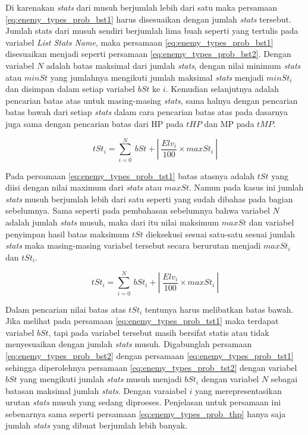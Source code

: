 Di karenakan \textit{stats} dari musuh berjumlah lebih dari satu maka persamaan \ref{eq:enemy_types_prob_bst1} harus disesuaikan dengan jumlah \textit{stats} tersebut. Jumlah stats dari musuh sendiri berjumlah lima buah seperti yang tertulis pada variabel \textit{List Stats Name}, maka persamaan \ref{eq:enemy_types_prob_bst1} disesuaikan menjadi seperti persamaan \ref{eq:enemy_types_prob_bst2}. Dengan variabel $N$ adalah batas maksimal dari jumlah \textit{stats}, dengan nilai minimum \textit{stats} atau $minSt$ yang jumlahnya mengikuti jumlah maksimal \textit{stats} menjadi $minSt_{i}$ dan disimpan dalam setiap variabel $bSt$ ke $i$. Kemudian selanjutnya adalah pencarian batas atas untuk masing-masing \textit{stats}, sama halnya dengan pencarian batas bawah dari setiap \textit{stats} dalam cara pencarian batas atas pada dasarnya juga sama dengan pencarian batas dari HP pada $tHP$ dan MP pada $tMP$.
\vspace{1ex}

\begin{equation}\label{eq:enemy_types_prob_tst1}
tSt_{i} = \sum_{i=0}^{N}\ bSt + \left |\ \frac{Elv_{i}}{100} \times maxSt_{i}\ \right |
\end{equation}

Pada persamaan \ref{eq:enemy_types_prob_tst1} batas atasnya adalah $tSt$ yang diisi dengan nilai maximum dari \textit{stats} atau $maxSt$. Namun pada kasus ini jumlah \textit{stats} musuh berjumlah lebih dari satu seperti yang sudah dibahas pada bagian sebelumnya. Sama seperti pada pembahasan sebelumnya bahwa variabel $N$ adalah jumlah \textit{stats} musuh, maka dari itu nilai maksimum $maxSt$ dan variabel penyimpan hasil batas maksimum $tSt$ dieksekusi sesuai satu-satu sesuai jumlah \textit{stats} maka masing-masing variabel tersebut secara berurutan menjadi $maxSt_{i}$ dan $tSt_{i}$.
\vspace{1ex}

\begin{equation}\label{eq:enemy_types_prob_tst2}
tSt_{i} = \sum_{i=0}^{N}\ bSt_{i} + \left |\ \frac{Elv_{i}}{100} \times maxSt_{i}\ \right |
\end{equation}

Dalam pencarian nilai batas atas $tSt_{i}$ tentunya harus melibatkan batas bawah. Jika melihat pada persamaan \ref{eq:enemy_types_prob_tst1} maka terdapat variabel $bSt$, tapi pada variabel tersebut masih bersifat statis atau tidak menyesuaikan dengan jumlah \textit{stats} musuh. Digabunglah persamaan \ref{eq:enemy_types_prob_bst2} dengan persamaan \ref{eq:enemy_types_prob_tst1} sehingga diperolehnya persamaan \ref{eq:enemy_types_prob_tst2} dengan variabel $bSt$ yang mengikuti jumlah \textit{stats} musuh menjadi $bSt_{i}$ dengan variabel $N$ sebagai batasan maksimal jumlah \textit{stats}. Dengan varaiabel $i$ yang merepresentasikan urutan \textit{stats} musuh yang sedang diproeses. Penjelasan untuk persamaan ini sebenarnya sama seperti persamaan \ref{eq:enemy_types_prob_thp} hanya saja jumlah \textit{stats} yang dibuat berjumlah lebih banyak.

